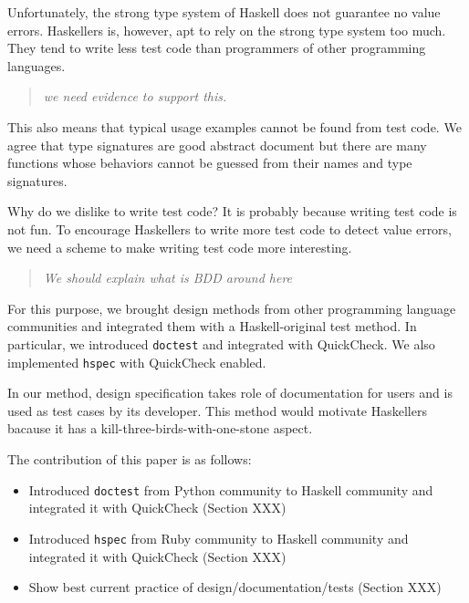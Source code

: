 \documentclass[preprint]{sigplanconf}
\begin{document}
Unfortunately, the strong type system of Haskell does not guarantee
no value errors.
Haskellers is, however, apt to rely on the strong type system too much.
They tend to write less test code than programmers of other
programming languages. 

\begin{quote}
    \emph{we need evidence to support this.}
\end{quote}

This also means that typical usage examples cannot be found from test code.
We agree that type signatures are good abstract document but
there are many functions whose behaviors cannot be guessed from
their names and type signatures.

Why do we dislike to write test code?
It is probably because writing test code is not fun.
To encourage Haskellers to write more test code
to detect value errors,
we need a scheme to make writing test code more interesting.

\begin{quote}
    \emph{We should explain what is BDD around here}
\end{quote}

For this purpose,
we brought design methods from other programming language communities and
integrated them with a Haskell-original test method.
In particular, we introduced {\tt doctest} and
integrated with QuickCheck. 
We also implemented {\tt hspec} with QuickCheck enabled.

In our method, design specification takes role of documentation for users and
is used as test cases by its developer. 
This method would motivate Haskellers
bacause it has a kill-three-birds-with-one-stone aspect.



The contribution of this paper is as follows:

\begin{itemize}
\item Introduced {\tt doctest} from Python community to Haskell community
and integrated it with QuickCheck (Section XXX)
\item Introduced {\tt hspec} from Ruby community to Haskell community and
integrated it with QuickCheck (Section XXX)
\item Show best current practice of design/documentation/tests (Section XXX)
\end{itemize}
\end{document}
